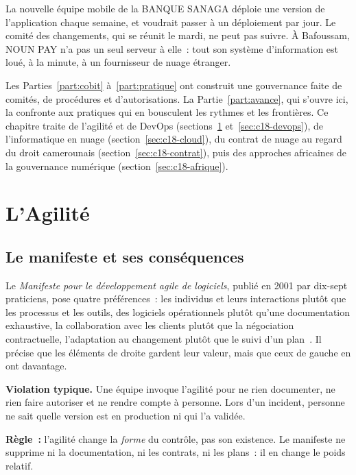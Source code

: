 La nouvelle équipe mobile de la BANQUE SANAGA déploie une version de
l'application chaque semaine, et voudrait passer à un déploiement par
jour. Le comité des changements, qui se réunit le mardi, ne peut pas
suivre. À Bafoussam, NOUN PAY n'a pas un seul serveur à elle~: tout son
système d'information est loué, à la minute, à un fournisseur de nuage
étranger.

Les Parties~\ref{part:cobit} à~\ref{part:pratique} ont construit une
gouvernance faite de comités, de procédures et d'autorisations. La
Partie~\ref{part:avance}, qui s'ouvre ici, la confronte aux pratiques
qui en bousculent les rythmes et les frontières. Ce chapitre traite de
l'agilité et de DevOps (sections~\ref{sec:c18-agile}
et~\ref{sec:c18-devops}), de l'informatique en nuage
(section~\ref{sec:c18-cloud}), du contrat de nuage au regard du droit
camerounais (section~\ref{sec:c18-contrat}), puis des approches
africaines de la gouvernance numérique (section~\ref{sec:c18-afrique}).

\separateur

\section{L'Agilité}
\label{sec:c18-agile}

\subsection{Le manifeste et ses conséquences}

Le \emph{Manifeste pour le développement agile de logiciels}, publié en
2001 par dix-sept praticiens, pose quatre préférences~: les individus et
leurs interactions plutôt que les processus et les outils, des logiciels
opérationnels plutôt qu'une documentation exhaustive, la collaboration
avec les clients plutôt que la négociation contractuelle, l'adaptation au
changement plutôt que le suivi d'un plan~\cite{agile2001manifeste}. Il
précise que les éléments de droite gardent leur valeur, mais que ceux de
gauche en ont davantage.

\begin{boxalert}
\textbf{Violation typique.} Une équipe invoque l'agilité pour ne rien
documenter, ne rien faire autoriser et ne rendre compte à personne. Lors
d'un incident, personne ne sait quelle version est en production ni qui
l'a validée.

\smallskip
\textbf{Règle~:} l'agilité change la \emph{forme} du contrôle, pas son
existence. Le manifeste ne supprime ni la documentation, ni les contrats,
ni les plans~: il en change le poids relatif.
\end{boxalert}

